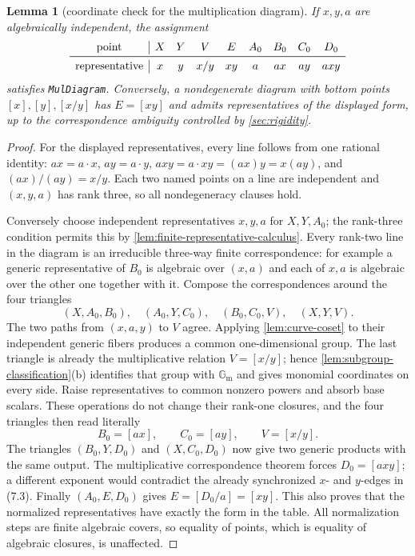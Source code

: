 \documentclass[11pt,oneside]{article}
\newtheorem{lemma}[theorem]{Lemma}
\theoremstyle{definition}
\theoremstyle{remark}
\newcommand{\Gm}{\mathbb G_{\mathrm m}}
\newcommand{\lean}[1]{\nolinkurl{#1}}
\begin{document}
\begin{lemma}[coordinate check for the multiplication diagram]\label{lem:mul-diagram}
If $x,y,a$ are algebraically independent, the assignment
\[
\begin{array}{c|cccccccc}
\text{point}&X&Y&V&E&A_0&B_0&C_0&D_0\\ \midrule
\text{representative}&x&y&x/y&xy&a&ax&ay&axy
\end{array}
\]
satisfies \lean{MulDiagram}.  Conversely, a nondegenerate diagram with bottom points
$[x],[y],[x/y]$ has $E=[xy]$ and admits representatives of the displayed form, up to
the correspondence ambiguity controlled by \cref{sec:rigidity}.
\end{lemma}
\begin{proof}
For the displayed representatives, every line follows from one rational identity:
$ax=a\cdot x$, $ay=a\cdot y$, $axy=a\cdot xy=(ax)y=x(ay)$, and
$(ax)/(ay)=x/y$.  Each two named points on a line are independent and
$(x,y,a)$ has rank three, so all nondegeneracy clauses hold.

Conversely choose independent representatives $x,y,a$ for $X,Y,A_0$; the rank-three
condition permits this by \cref{lem:finite-representative-calculus}.  Every rank-two line
in the diagram is an irreducible three-way finite correspondence: for example a generic
representative of $B_0$ is algebraic over $(x,a)$ and each of $x,a$ is algebraic over the
other one together with it.  Compose the correspondences around the four triangles
\[
 (X,A_0,B_0),\quad(A_0,Y,C_0),\quad(B_0,C_0,V),
 \quad(X,Y,V).
\]
The two paths from $(x,a,y)$ to $V$ agree.  Applying
\cref{lem:curve-coset} to their independent generic fibers produces a common
one-dimensional group.  The last triangle is already the multiplicative relation
$V=[x/y]$; hence \cref{lem:subgroup-classification}(b) identifies that group with
$\Gm$ and gives monomial coordinates on every side.  Raise representatives to common
nonzero powers and absorb base scalars.  These operations do not change their rank-one
closures, and the four triangles then read literally
\[
 B_0=[ax],\qquad C_0=[ay],\qquad V=[x/y].                       \tag{7.3}
\]
The triangles $(B_0,Y,D_0)$ and $(X,C_0,D_0)$ now give two generic products with the
same output.  The multiplicative correspondence theorem forces
$D_0=[axy]$; a different exponent would contradict the already synchronized $x$- and
$y$-edges in (7.3).  Finally $(A_0,E,D_0)$ gives
$E=[D_0/a]=[xy]$.  This also proves that the normalized representatives have exactly the
form in the table.  All normalization steps are finite algebraic covers, so equality of
points, which is equality of algebraic closures, is unaffected.
\end{proof}
\end{document}
